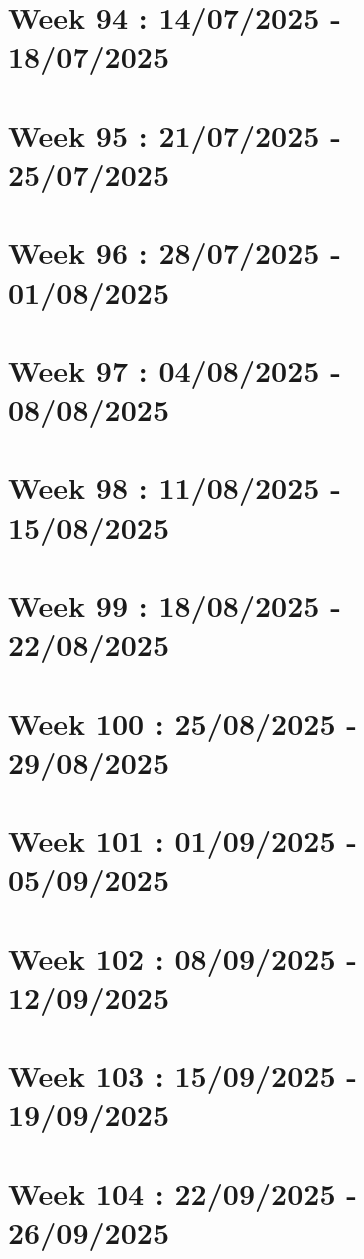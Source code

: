 \documentclass[french]{article}
\begin{document}
	\section{Week 94 : 14/07/2025 - 18/07/2025}

	\section{Week 95 : 21/07/2025 - 25/07/2025}

	\section{Week 96 : 28/07/2025 - 01/08/2025}

	\section{Week 97 : 04/08/2025 - 08/08/2025}

	\section{Week 98 : 11/08/2025 - 15/08/2025}

	\section{Week 99 : 18/08/2025 - 22/08/2025}

	\section{Week 100 : 25/08/2025 - 29/08/2025}

	\section{Week 101 : 01/09/2025 - 05/09/2025}

	\section{Week 102 : 08/09/2025 - 12/09/2025}

	\section{Week 103 : 15/09/2025 - 19/09/2025}

	\section{Week 104 : 22/09/2025 - 26/09/2025}
\end{document}
